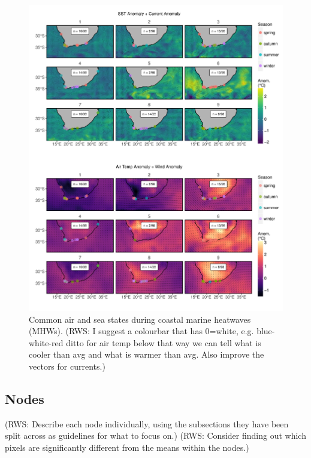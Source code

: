 \documentclass[a4paper,10pt,review]{elsarticle}
\begin{document}
\begin{figure}
\includegraphics[width=1.0\textwidth]{figure_4.pdf}
\caption{Common air and sea states during coastal marine heatwaves (MHWs). (RWS: I suggest a colourbar that has 0=white, e.g. blue-white-red ditto for air temp below that way we can tell what is cooler than avg and what is warmer than avg. Also improve the vectors for currents.)}
\label{figure4}
\end{figure}

\subsection{Nodes}

(RWS: Describe each node individually, using the subsections they have been split across as guidelines for what to focus on.)
(RWS: Consider finding out which pixels are significantly different from the means within the nodes.)
\end{document}
